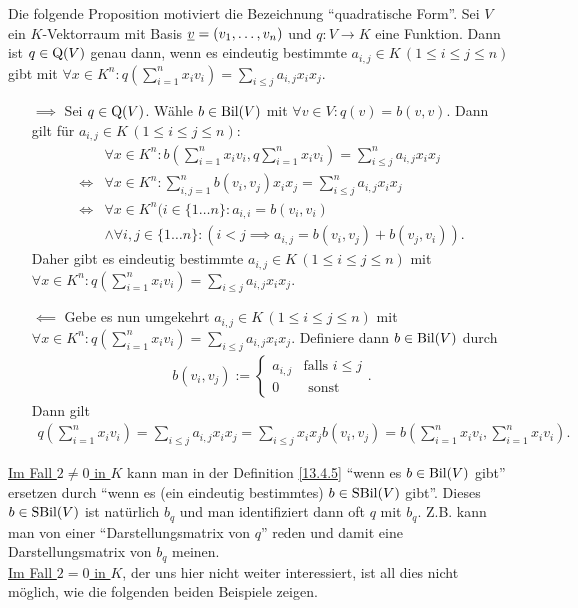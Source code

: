 \documentclass[../../main.tex]{subfiles}
\begin{document}
\begin{pro}\label{13.4.7}
Die folgende Proposition motiviert die Bezeichnung \enquote{quadratische Form}. Sei $V$ ein $K$-Vektorraum mit Basis ${\underline v}=(v_1,\ldots ,v_n)$ und $q: V\to K$ eine Funktion. Dann ist $q\in \operatorname{Q}(V)$ genau dann, wenn es eindeutig bestimmte $a_{i,j}\in K\, (1\le i\le j\le n)$ gibt mit $\forall x\in K^n: q\left(\sum_{i=1}^nx_iv_i\right)=\sum_{i\le j}a_{i,j}x_ix_j$.
\end{pro}
\begin{cproof}
\begin{itemize}
\item[$\implies$] Sei $q\in \operatorname{Q}(V)$. Wähle $b\in \operatorname{Bil}(V)$ mit $\forall v\in V: q(v)=b(v,v)$. Dann gilt für $a_{i,j}\in K\, (1\le i\le j\le n)$:
\begin{align*}
&\forall x\in K^n: b\left(\sum_{i=1}^n x_iv_i, q \sum_{i=1}^n x_iv_i\right)=\sum_{i\le j}^n a_{i,j}x_ix_j\\
\Longleftrightarrow&\forall x\in K^n:\sum_{i,j=1}^n b(v_i,v_j)x_ix_j=\sum_{i\le j}^n a_{i,j}x_ix_j\\
\Longleftrightarrow&\forall x\in K^n (i\in\{1\ldots n\}: a_{i,i}=b(v_i,v_i)\\
&\land \forall i,j\in\{1\ldots n\}: (i<j\implies a_{i,j}=b(v_i,v_j)+b(v_j,v_i)).
\end{align*}
Daher gibt es eindeutig bestimmte $a_{i,j}\in K\, (1\le i\le j\le n)$ mit $\forall x\in K^n: q\left(\sum_{i=1}^nx_iv_i\right)=\sum_{i\le j}a_{i,j}x_ix_j$.
\item[$\impliedby$] Gebe es nun umgekehrt $a_{i,j}\in K\, (1\le i\le j\le n)$ mit $\forall x\in K^n: q\left(\sum_{i=1}^nx_iv_i\right)=\sum_{i\le j}a_{i,j}x_ix_j$. Definiere dann $b\in \operatorname{Bil}(V)$ durch
\begin{align*}
b(v_i,v_j):=\begin{cases}a_{i,j} & \text{falls }i\le j\\ 0 & \text{ sonst}\end{cases}.
\end{align*}
Dann gilt
\begin{align*}
q\left(\sum_{i=1}^nx_iv_i\right)=\sum_{i\le j}a_{i,j}x_ix_j=\sum_{i\le j}x_ix_jb(v_i,v_j)=b\left(\sum_{i=1}^n x_iv_i,\sum_{i=1}^nx_iv_i\right).
\end{align*}
\end{itemize}
\end{cproof}

\begin{bem}\label{13.4.8}
\underline{Im Fall $2\neq 0$ in $K$} kann man in der Definition \ref{13.4.5} \enquote{wenn es $b\in \operatorname{Bil}(V)$ gibt} ersetzen durch \enquote{wenn es (ein eindeutig bestimmtes) $b\in \operatorname{SBil}(V)$ gibt}. Dieses $b\in \operatorname{SBil}(V)$ ist natürlich $b_q$ und man identifiziert dann oft $q$ mit $b_q$. Z.B. kann man von einer \enquote{Darstellungsmatrix von $q$} reden und damit eine Darstellungsmatrix von $b_q$ meinen.\\
	
\noindent\underline{Im Fall $2=0$ in $K$}, der uns hier nicht weiter interessiert, ist all dies nicht möglich, wie die folgenden beiden Beispiele zeigen.
\end{bem}
	
\end{document}
